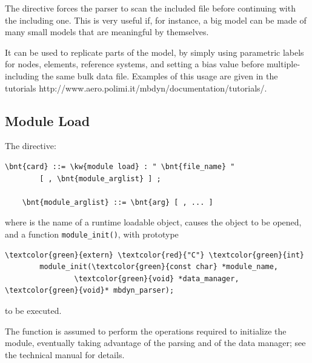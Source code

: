 \bigskip


\bigskip

The  directive forces the parser to scan the included file
 before continuing with the including one.
This is very useful if, for instance, a big model can be made of many
small models that are meaningful by themselves.

It can be used to replicate parts of the model, by simply using parametric 
labels for nodes, elements, reference systems, and setting a bias value 
before multiple-including the same bulk data file.
Examples of this usage are given in the tutorials
	{http://www.aero.polimi.it/mbdyn/documentation/tutorials/}.



\subsection{Module Load}
\label{sec:GENERAL:MODULE-LOAD}
The  directive:
\begin{Verbatim}[commandchars=\\\{\}]
    \bnt{card} ::= \kw{module load} : " \bnt{file_name} "
        [ , \bnt{module_arglist} ] ;

    \bnt{module_arglist} ::= \bnt{arg} [ , ... ]
\end{Verbatim}
where  is the name of a runtime loadable object,
causes the object to be opened, and a function \texttt{module\_init()},
with prototype
\begin{Verbatim}[commandchars=\\\{\}]
        \textcolor{green}{extern} \textcolor{red}{"C"} \textcolor{green}{int}
        module_init(\textcolor{green}{const char} *module_name,
                \textcolor{green}{void} *data_manager, \textcolor{green}{void}* mbdyn_parser);
\end{Verbatim}
to be executed.

The function is assumed to perform the operations required to initialize
the module, eventually taking advantage of the parsing
and of the data manager; see the technical manual for details.

